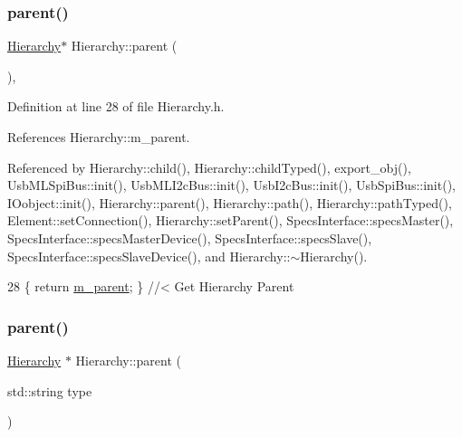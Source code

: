 \subsubsection{\texorpdfstring{parent()}{parent()}\hspace{0.1cm}{\footnotesize\ttfamily [1/2]}}
{\footnotesize\ttfamily \hyperlink{classHierarchy}{Hierarchy}$\ast$ Hierarchy\+::parent (\begin{DoxyParamCaption}{ }\end{DoxyParamCaption})\hspace{0.3cm}{\ttfamily [inline]}, {\ttfamily [inherited]}}



Definition at line 28 of file Hierarchy.\+h.



References Hierarchy\+::m\+\_\+parent.



Referenced by Hierarchy\+::child(), Hierarchy\+::child\+Typed(), export\+\_\+obj(), Usb\+M\+L\+Spi\+Bus\+::init(), Usb\+M\+L\+I2c\+Bus\+::init(), Usb\+I2c\+Bus\+::init(), Usb\+Spi\+Bus\+::init(), I\+Oobject\+::init(), Hierarchy\+::parent(), Hierarchy\+::path(), Hierarchy\+::path\+Typed(), Element\+::set\+Connection(), Hierarchy\+::set\+Parent(), Specs\+Interface\+::specs\+Master(), Specs\+Interface\+::specs\+Master\+Device(), Specs\+Interface\+::specs\+Slave(), Specs\+Interface\+::specs\+Slave\+Device(), and Hierarchy\+::$\sim$\+Hierarchy().


\begin{DoxyCode}
28 \{ \textcolor{keywordflow}{return} \hyperlink{classHierarchy_a5814bb280d4e8539ab25ab6cbfb9cc4f}{m\_parent}; \}  \textcolor{comment}{//< Get Hierarchy Parent}
\end{DoxyCode}
\mbox{\label{classHierarchy_ad550588733bf75ac5c0fcfd7c8fd11a6}} 
\subsubsection{\texorpdfstring{parent()}{parent()}\hspace{0.1cm}{\footnotesize\ttfamily [2/2]}}
{\footnotesize\ttfamily \hyperlink{classHierarchy}{Hierarchy} $\ast$ Hierarchy\+::parent (\begin{DoxyParamCaption}\item[{std\+::string}]{type }\end{DoxyParamCaption})\hspace{0.3cm}{\ttfamily [inherited]}}



